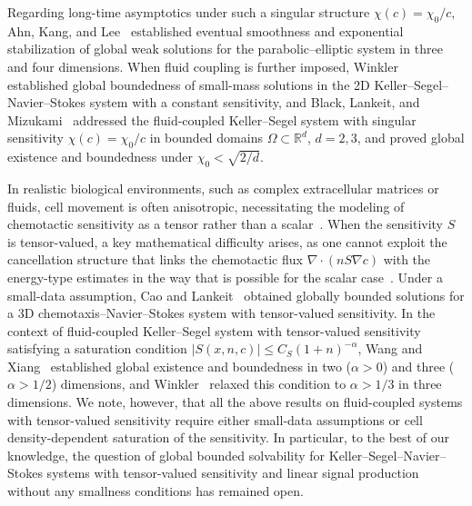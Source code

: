 \documentclass{amsart}
\numberwithin{equation}{section}
\begin{document}
Regarding long-time asymptotics under such a singular structure $\chi(c)=\chi_{0}/ c$, Ahn, Kang, and Lee~\cite{Ahn_Kang_Lee_2019} established eventual smoothness and exponential stabilization of global weak solutions for the parabolic--elliptic system in three and four dimensions.
When fluid coupling is further imposed, Winkler~\cite{Winkler2020} established global boundedness of small-mass solutions in the 2D Keller--Segel--Navier--Stokes system with a constant sensitivity, and
Black, Lankeit, and Mizukami~\cite{Black_Lankeit_Mizukami_2018} addressed the fluid-coupled Keller--Segel system with singular sensitivity $\chi(c)=\chi_{0}/c$ in bounded domains $\Omega\subset\mathbb{R}^{d}$, $d=2,3$, and proved global existence and boundedness under $\chi_{0}<\sqrt{2/d}$. 

In realistic biological environments, such as complex extracellular matrices or fluids, cell movement is often anisotropic, necessitating the modeling of chemotactic sensitivity as a tensor rather than a scalar~\cite{Bellomo_2015}. When the sensitivity $S$ is tensor-valued, a key mathematical difficulty arises, as one cannot exploit the cancellation structure that links the chemotactic flux $\nabla \cdot (nS\nabla c)$ with the energy-type estimates in the way that is possible for the scalar case~\cite{Winkler2012, Lankeit_Winkler_2023}. Under a small-data assumption, Cao and Lankeit~\cite{CaoLankeit_2016} obtained globally bounded solutions for a 3D chemotaxis--Navier--Stokes system with tensor-valued sensitivity. In the context of fluid-coupled Keller--Segel system with tensor-valued sensitivity satisfying a saturation condition $|S(x,n,c)|\le C_{S}(1+n)^{-\alpha}$, Wang and Xiang~\cite{WangXiang_2015,WangXiang_2016} established global existence and boundedness in two ($\alpha>0$) and three ($\alpha>1/2$) dimensions, and Winkler~\cite{Winkler_2018_fluid_saturated} relaxed this condition to  $\alpha>1/3$ in three dimensions.  
We note, however, that all the above results on fluid-coupled systems with tensor-valued sensitivity require either small-data assumptions or cell density-dependent saturation of the sensitivity. In particular, to the best of our knowledge, the question of global bounded solvability for Keller--Segel--Navier--Stokes systems with tensor-valued sensitivity and linear signal production  without any smallness conditions has remained open. 
\end{document}
